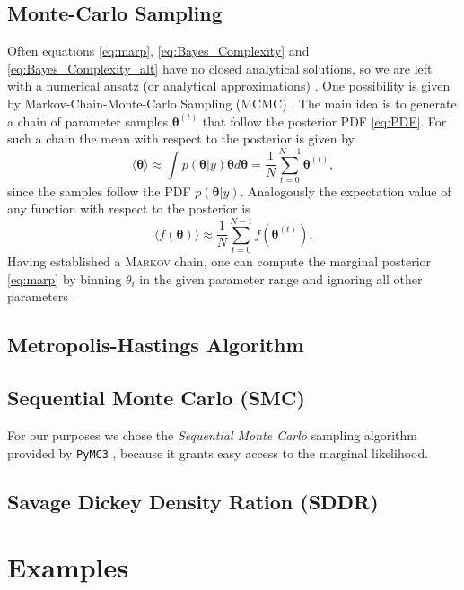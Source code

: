 \documentclass[%
 reprint,
 amsmath,amssymb,
 aps,
]{revtex4-1}
\begin{document}
 \subsection{Monte-Carlo Sampling}
\noindent Often equations \eqref{eq:marp}, \eqref{eq:Bayes_Complexity} and \eqref{eq:Bayes_Complexity_alt} have no closed analytical solutions, so we are left with a numerical ansatz (or analytical approximations) \cite{Toussaint}. One possibility is given by Markov-Chain-Monte-Carlo Sampling (MCMC) {\color{red} \cite{??}}. The main idea is to generate a chain of parameter samples $\boldsymbol{\theta}^{(t)}$ that follow the posterior PDF \eqref{eq:PDF}. For such a chain the mean with respect to the posterior is given by 
 \begin{equation}
 	\langle \boldsymbol{\theta}\rangle\approx \int p(\boldsymbol{\theta} | y)\boldsymbol{\theta}d\boldsymbol{\theta}=\frac{1}{N}\sum_{t=0}^{N-1}\boldsymbol{\theta}^{(t)},
 \end{equation}
since the samples follow the PDF $p(\boldsymbol{\theta} | y)$. Analogously the expectation value of any function with respect to the posterior is
 \begin{equation}
	\langle f(\boldsymbol{\theta})\rangle\approx\frac{1}{N}\sum_{t=0}^{N-1}f(\boldsymbol{\theta}^{(t)}).
\end{equation}
Having established a \textsc{Markov} chain, one can compute the marginal posterior \eqref{eq:marp} by binning $\theta_i$ in the given parameter range and ignoring all other parameters \cite{Trotta_2008}. 

\subsection{Metropolis-Hastings Algorithm}

\subsection{Sequential Monte Carlo (SMC)}
 \noindent For our purposes we chose the \emph{Sequential Monte Carlo} sampling algorithm provided by \texttt{PyMC3} \cite{PyMC3_SMC}, because it grants easy access to the marginal likelihood. 
 
\subsection{Savage Dickey Density Ration (SDDR)}


\section{Examples}
\end{document}
